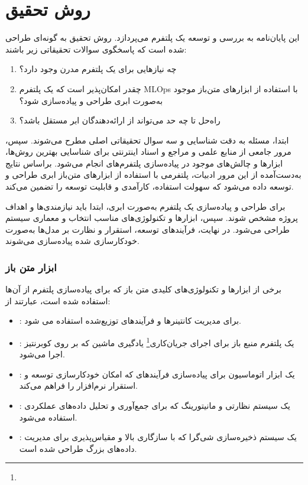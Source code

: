 \section{روش تحقیق}

این پایان‌نامه به بررسی و توسعه یک پلتفرم  می‌پردازد. روش تحقیق به گونه‌ای طراحی شده‌ است که پاسخگوی سوالات تحقیقاتی زیر باشند:

\begin{enumerate}
	\item 
	چه نیازهایی برای یک پلتفرم  مدرن وجود دارد؟
	\item
	چقدر امکان‌پذیر است که یک پلتفرم MLOps با استفاده از ابزارهای متن‌باز موجود به‌صورت ابری طراحی و پیاده‌سازی شود؟
	\item 
	راه‌حل تا چه حد می‌تواند از ارائه‌دهندگان ابر مستقل باشد؟
\end{enumerate}

ابتدا، مسئله به دقت شناسایی و سه سوال تحقیقاتی اصلی مطرح می‌شوند. سپس، مرور جامعی از منابع علمی و مراجع و اسناد اینترنتی برای شناسایی بهترین روش‌ها، ابزارها و چالش‌های موجود در پیاده‌سازی پلتفرم‌های  انجام می‌شود. براساس نتایج به‌دست‌آمده از این مرور ادبیات، پلتفرمی با استفاده از ابزارهای متن‌باز ابری طراحی و توسعه داده می‌شود که سهولت استفاده، کارآمدی و قابلیت توسعه را تضمین می‌کند. 


برای طراحی و پیاده‌سازی یک پلتفرم  به‌صورت ابری، ابتدا باید نیازمندی‌ها و اهداف پروژه مشخص شوند. سپس، ابزارها و تکنولوژی‌های مناسب انتخاب و معماری سیستم طراحی می‌شود. در نهایت، فرآیندهای توسعه، استقرار و نظارت بر مدل‌ها به‌صورت خودکارسازی شده پیاده‌سازی می‌شوند.

\subsubsection{ابزار متن باز}
برخی از ابزارها و تکنولوژی‌های کلیدی متن باز که برای پیاده‌سازی پلتفرم از آن‌ها استفاده شده است، عبارتند از:
\begin{itemize}
	\item 
	:
	 برای مدیریت کانتینرها و فرآیندهای توزیع‌شده استفاده می شود.
	 \item 
	 :
	 یک پلتفرم منبع باز برای اجرای جریان‌کاری\footnote{} یادگیری ماشین که بر روی کوبرنتیز اجرا می‌شود.
	 \item 
	 :
	 یک ابزار اتوماسیون برای پیاده‌سازی فرآیندهای  که امکان خودکارسازی توسعه و استقرار نرم‌افزار را فراهم می‌کند.
	 \item 
	 :
	 یک سیستم نظارتی و مانیتورینگ که برای جمع‌آوری و تحلیل داده‌های عملکردی استفاده می‌شود.
	 \item
	 :
	 یک سیستم ذخیره‌سازی شی‌گرا که با سازگاری بالا و مقیاس‌پذیری برای مدیریت داده‌های بزرگ طراحی شده است.
	 
\end{itemize}

